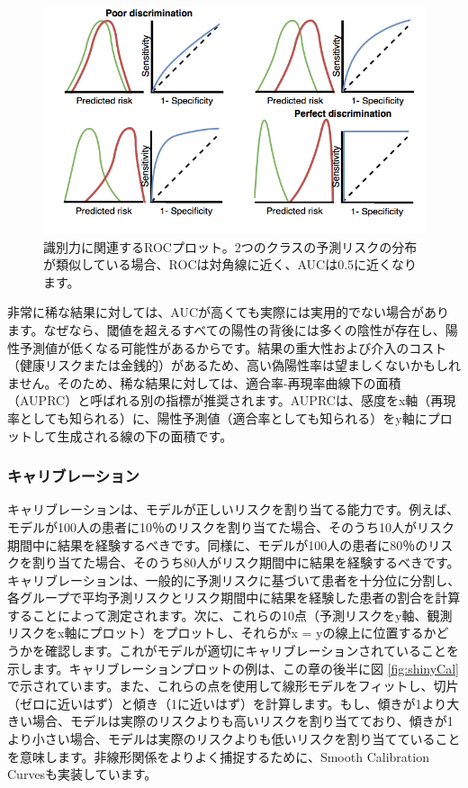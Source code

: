 \documentclass[
  11pt]{book}
\theoremstyle{definition}
\theoremstyle{definition}
\theoremstyle{definition}
\theoremstyle{definition}
\theoremstyle{remark}
\begin{document}
\begin{figure}
\includegraphics[width=1\linewidth]{images/PatientLevelPrediction/theory/roctheory} \caption{識別力に関連するROCプロット。2つのクラスの予測リスクの分布が類似している場合、ROCは対角線に近く、AUCは0.5に近くなります。}\label{fig:figuretheoryroctheory}
\end{figure}

非常に稀な結果に対しては、AUCが高くても実際には実用的でない場合があります。なぜなら、閾値を超えるすべての陽性の背後には多くの陰性が存在し、陽性予測値が低くなる可能性があるからです。結果の重大性および介入のコスト（健康リスクまたは金銭的）があるため、高い偽陽性率は望ましくないかもしれません。そのため、稀な結果に対しては、適合率-再現率曲線下の面積（AUPRC）と呼ばれる別の指標が推奨されます。AUPRCは、感度をx軸（再現率としても知られる）に、陽性予測値（適合率としても知られる）をy軸にプロットして生成される線の下の面積です。 

\subsubsection*{キャリブレーション}\label{ux30adux30e3ux30eaux30d6ux30ecux30fcux30b7ux30e7ux30f3}

キャリブレーションは、モデルが正しいリスクを割り当てる能力です。例えば、モデルが100人の患者に10％のリスクを割り当てた場合、そのうち10人がリスク期間中に結果を経験するべきです。同様に、モデルが100人の患者に80％のリスクを割り当てた場合、そのうち80人がリスク期間中に結果を経験するべきです。キャリブレーションは、一般的に予測リスクに基づいて患者を十分位に分割し、各グループで平均予測リスクとリスク期間中に結果を経験した患者の割合を計算することによって測定されます。次に、これらの10点（予測リスクをy軸、観測リスクをx軸にプロット）をプロットし、それらがx = yの線上に位置するかどうかを確認します。これがモデルが適切にキャリブレーションされていることを示します。キャリブレーションプロットの例は、この章の後半に図 \ref{fig:shinyCal} で示されています。また、これらの点を使用して線形モデルをフィットし、切片（ゼロに近いはず）と傾き（1に近いはず）を計算します。もし、傾きが1より大きい場合、モデルは実際のリスクよりも高いリスクを割り当てており、傾きが1より小さい場合、モデルは実際のリスクよりも低いリスクを割り当てていることを意味します。非線形関係をよりよく捕捉するために、Smooth Calibration Curvesも実装しています。 
\end{document}
